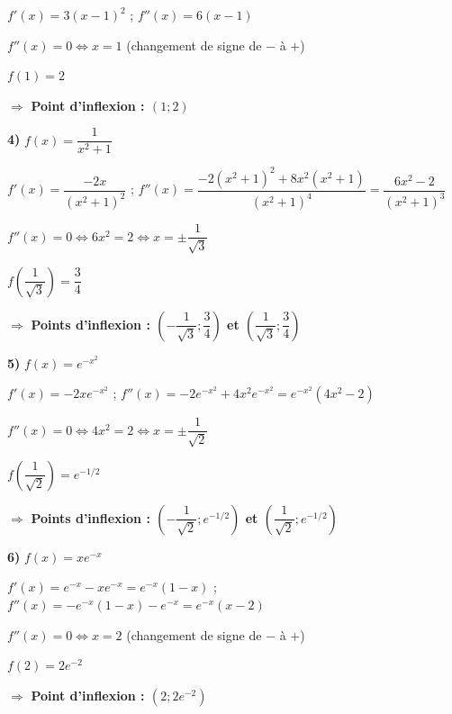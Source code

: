 \documentclass[11pt,a4paper]{article}  %
\begin{document}
$f'(x) = 3(x-1)^2$ \quad ; \quad $f''(x) = 6(x-1)$

$f''(x) = 0 \Leftrightarrow x = 1$ (changement de signe de $-$ à $+$)

$f(1) = 2$

$\Rightarrow$ \textbf{Point d'inflexion : $(1; 2)$}

\textbf{4)} $f(x) = \dfrac{1}{x^2+1}$

$f'(x) = \dfrac{-2x}{(x^2+1)^2}$ \quad ; \quad $f''(x) = \dfrac{-2(x^2+1)^2 + 8x^2(x^2+1)}{(x^2+1)^4} = \dfrac{6x^2-2}{(x^2+1)^3}$

$f''(x) = 0 \Leftrightarrow 6x^2 = 2 \Leftrightarrow x = \pm\dfrac{1}{\sqrt{3}}$

$f\left(\dfrac{1}{\sqrt{3}}\right) = \dfrac{3}{4}$

$\Rightarrow$ \textbf{Points d'inflexion : $\left(-\dfrac{1}{\sqrt{3}}; \dfrac{3}{4}\right)$ et $\left(\dfrac{1}{\sqrt{3}}; \dfrac{3}{4}\right)$}

\textbf{5)} $f(x) = e^{-x^2}$

$f'(x) = -2xe^{-x^2}$ \quad ; \quad $f''(x) = -2e^{-x^2} + 4x^2e^{-x^2} = e^{-x^2}(4x^2-2)$

$f''(x) = 0 \Leftrightarrow 4x^2 = 2 \Leftrightarrow x = \pm\dfrac{1}{\sqrt{2}}$

$f\left(\dfrac{1}{\sqrt{2}}\right) = e^{-1/2}$

$\Rightarrow$ \textbf{Points d'inflexion : $\left(-\dfrac{1}{\sqrt{2}}; e^{-1/2}\right)$ et $\left(\dfrac{1}{\sqrt{2}}; e^{-1/2}\right)$}

\textbf{6)} $f(x) = xe^{-x}$

$f'(x) = e^{-x} - xe^{-x} = e^{-x}(1-x)$ \quad ; \quad $f''(x) = -e^{-x}(1-x) - e^{-x} = e^{-x}(x-2)$

$f''(x) = 0 \Leftrightarrow x = 2$ (changement de signe de $-$ à $+$)

$f(2) = 2e^{-2}$

$\Rightarrow$ \textbf{Point d'inflexion : $(2; 2e^{-2})$}
\end{document}

